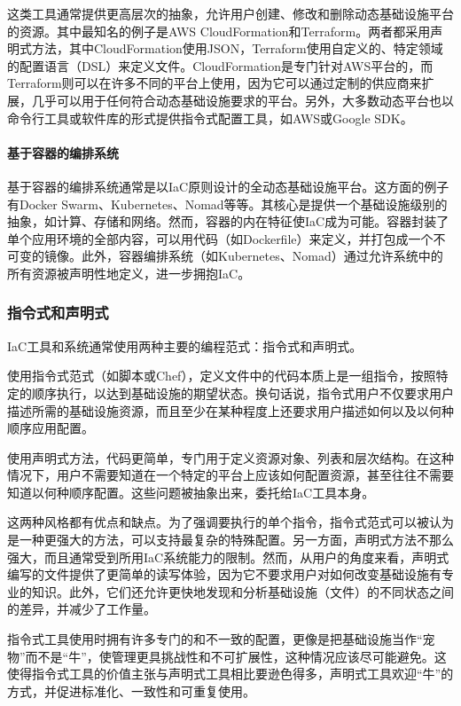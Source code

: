 \documentclass[macfonts,master]{njuthesis}
\begin{document}
这类工具通常提供更高层次的抽象，允许用户创建、修改和删除动态基础设施平台的资源。其中最知名的例子是AWS CloudFormation和Terraform。两者都采用声明式方法，其中CloudFormation使用JSON，Terraform使用自定义的、特定领域的配置语言（DSL）来定义文件。CloudFormation是专门针对AWS平台的，而Terraform则可以在许多不同的平台上使用，因为它可以通过定制的供应商来扩展，几乎可以用于任何符合动态基础设施要求的平台。另外，大多数动态平台也以命令行工具或软件库的形式提供指令式配置工具，如AWS或Google SDK。

\paragraph{基于容器的编排系统}

基于容器的编排系统通常是以IaC原则设计的全动态基础设施平台。这方面的例子有Docker Swarm、Kubernetes、Nomad等等。其核心是提供一个基础设施级别的抽象，如计算、存储和网络。然而，容器的内在特征使IaC成为可能。容器封装了单个应用环境的全部内容，可以用代码（如Dockerfile）来定义，并打包成一个不可变的镜像。此外，容器编排系统（如Kubernetes、Nomad）通过允许系统中的所有资源被声明性地定义，进一步拥抱IaC。

\subsubsection{指令式和声明式}

IaC工具和系统通常使用两种主要的编程范式：指令式和声明式。

使用指令式范式（如脚本或Chef），定义文件中的代码本质上是一组指令，按照特定的顺序执行，以达到基础设施的期望状态。换句话说，指令式用户不仅要求用户描述所需的基础设施资源，而且至少在某种程度上还要求用户描述如何以及以何种顺序应用配置。

使用声明式方法，代码更简单，专门用于定义资源对象、列表和层次结构。在这种情况下，用户不需要知道在一个特定的平台上应该如何配置资源，甚至往往不需要知道以何种顺序配置。这些问题被抽象出来，委托给IaC工具本身。

这两种风格都有优点和缺点。为了强调要执行的单个指令，指令式范式可以被认为是一种更强大的方法，可以支持最复杂的特殊配置。另一方面，声明式方法不那么强大，而且通常受到所用IaC系统能力的限制。然而，从用户的角度来看，声明式编写的文件提供了更简单的读写体验，因为它不要求用户对如何改变基础设施有专业的知识。此外，它们还允许更快地发现和分析基础设施（文件）的不同状态之间的差异，并减少了工作量。

指令式工具使用时拥有许多专门的和不一致的配置，更像是把基础设施当作``宠物''而不是``牛''，使管理更具挑战性和不可扩展性，这种情况应该尽可能避免。这使得指令式工具的价值主张与声明式工具相比要逊色得多，声明式工具欢迎``牛''的方式，并促进标准化、一致性和可重复使用。
\end{document}
